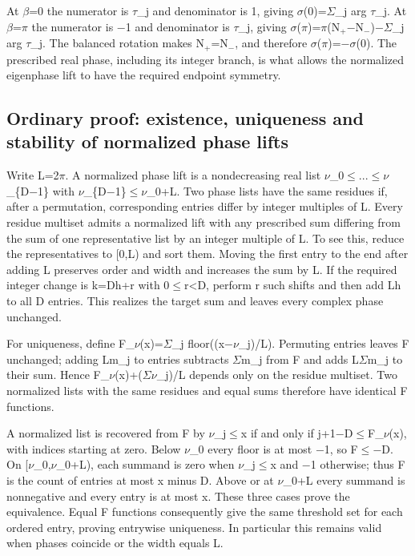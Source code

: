 \documentclass[11pt,a4paper]{article}
\begin{document}
At \ensuremath{\beta}=0 the numerator is \ensuremath{\tau}\_j and denominator is 1, giving \ensuremath{\sigma}(0)=\ensuremath{\Sigma}\_j arg \ensuremath{\tau}\_j. At \ensuremath{\beta}=\ensuremath{\pi} the numerator is \ensuremath{-}1 and denominator is \ensuremath{\tau}\_j, giving \ensuremath{\sigma}(\ensuremath{\pi})=\ensuremath{\pi}(N\ensuremath{_{+}}\ensuremath{-}N\ensuremath{_{-}})\ensuremath{-}\ensuremath{\Sigma}\_j arg \ensuremath{\tau}\_j. The balanced rotation makes N\ensuremath{_{+}}=N\ensuremath{_{-}}, and therefore \ensuremath{\sigma}(\ensuremath{\pi})=\ensuremath{-}\ensuremath{\sigma}(0). The prescribed real phase, including its integer branch, is what allows the normalized eigenphase lift to have the required endpoint symmetry.

\subsection{Ordinary proof: existence, uniqueness and stability of normalized phase lifts}
Write L=2\ensuremath{\pi}. A normalized phase lift is a nondecreasing real list \ensuremath{\nu}\_0\ensuremath{\leq}...\ensuremath{\leq}\ensuremath{\nu}\_\{D\ensuremath{-}1\} with \ensuremath{\nu}\_\{D\ensuremath{-}1\}\ensuremath{\leq}\ensuremath{\nu}\_0+L. Two phase lists have the same residues if, after a permutation, corresponding entries differ by integer multiples of L. Every residue multiset admits a normalized lift with any prescribed sum differing from the sum of one representative list by an integer multiple of L. To see this, reduce the representatives to [0,L) and sort them. Moving the first entry to the end after adding L preserves order and width and increases the sum by L. If the required integer change is k=Dh+r with 0\ensuremath{\leq}r<D, perform r such shifts and then add Lh to all D entries. This realizes the target sum and leaves every complex phase unchanged.

For uniqueness, define F\_\ensuremath{\nu}(x)=\ensuremath{\Sigma}\_j floor((x\ensuremath{-}\ensuremath{\nu}\_j)/L). Permuting entries leaves F unchanged; adding Lm\_j to entries subtracts \ensuremath{\Sigma}m\_j from F and adds L\ensuremath{\Sigma}m\_j to their sum. Hence F\_\ensuremath{\nu}(x)+(\ensuremath{\Sigma}\ensuremath{\nu}\_j)/L depends only on the residue multiset. Two normalized lists with the same residues and equal sums therefore have identical F functions.

A normalized list is recovered from F by \ensuremath{\nu}\_j\ensuremath{\leq}x if and only if j+1\ensuremath{-}D\ensuremath{\leq}F\_\ensuremath{\nu}(x), with indices starting at zero. Below \ensuremath{\nu}\_0 every floor is at most \ensuremath{-}1, so F\ensuremath{\leq}\ensuremath{-}D. On [\ensuremath{\nu}\_0,\ensuremath{\nu}\_0+L), each summand is zero when \ensuremath{\nu}\_j\ensuremath{\leq}x and \ensuremath{-}1 otherwise; thus F is the count of entries at most x minus D. Above or at \ensuremath{\nu}\_0+L every summand is nonnegative and every entry is at most x. These three cases prove the equivalence. Equal F functions consequently give the same threshold set for each ordered entry, proving entrywise uniqueness. In particular this remains valid when phases coincide or the width equals L.
\end{document}
